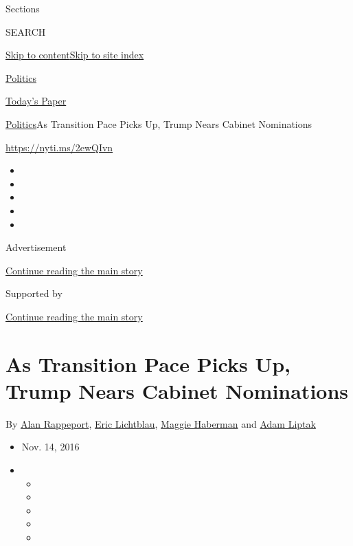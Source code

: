 Sections

SEARCH

\protect\hyperlink{site-content}{Skip to
content}\protect\hyperlink{site-index}{Skip to site index}

\href{https://www.nytimes.com/section/politics}{Politics}

\href{https://myaccount.nytimes.com/auth/login?response_type=cookie\&client_id=vi}{}

\href{https://www.nytimes.com/section/todayspaper}{Today's Paper}

\href{/section/politics}{Politics}\textbar{}As Transition Pace Picks Up,
Trump Nears Cabinet Nominations

\url{https://nyti.ms/2ewQIvn}

\begin{itemize}
\item
\item
\item
\item
\item
\end{itemize}

Advertisement

\protect\hyperlink{after-top}{Continue reading the main story}

Supported by

\protect\hyperlink{after-sponsor}{Continue reading the main story}

\hypertarget{as-transition-pace-picks-up-trump-nears-cabinet-nominations}{%
\section{As Transition Pace Picks Up, Trump Nears Cabinet
Nominations}\label{as-transition-pace-picks-up-trump-nears-cabinet-nominations}}

By \href{https://www.nytimes.com/by/alan-rappeport}{Alan Rappeport},
\href{http://www.nytimes.com/by/eric-lichtblau}{Eric Lichtblau},
\href{http://www.nytimes.com/by/maggie-haberman}{Maggie Haberman} and
\href{http://www.nytimes.com/by/adam-liptak}{Adam Liptak}

\begin{itemize}
\item
  Nov. 14, 2016
\item
  \begin{itemize}
  \item
  \item
  \item
  \item
  \item
  \end{itemize}
\end{itemize}

